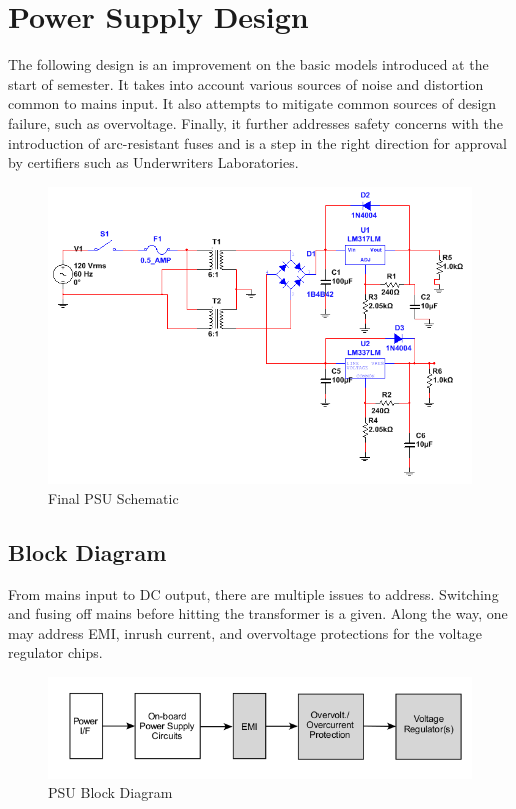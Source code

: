 \documentclass[journal]{IEEEtran}
\begin{document}
\section{Power Supply Design}

The following design is an improvement on the basic models introduced at the start of semester. It takes into account various sources of noise and distortion common to mains input. It also attempts to mitigate common sources of design failure, such as overvoltage. Finally, it further addresses safety concerns with the introduction of arc-resistant fuses and is a step in the right direction for approval by certifiers such as Underwriters Laboratories. 

\begin{figure}[H]
\centering
\includegraphics[scale=.36]{final-psu.png}
\caption{Final PSU Schematic}
\label{fig_psu_schem}
\end{figure}

\subsection{Block Diagram}

From mains input to DC output, there are multiple issues to address. Switching and fusing off mains before hitting the transformer is a given. Along the way, one may address EMI, inrush current, and overvoltage protections for the voltage regulator chips.

\begin{figure}[H]
\centering
\includegraphics[scale=.35]{psu-block.png}
\caption{PSU Block Diagram}
\label{fig_psu_block}
\end{figure}
\end{document}
